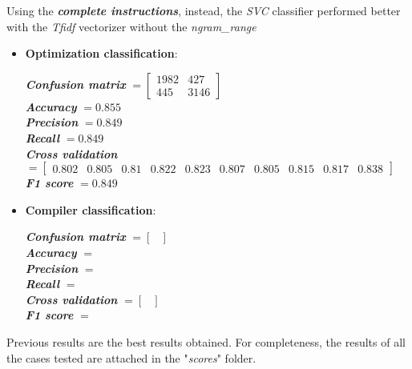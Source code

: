 \documentclass[11pt]{article}
\begin{document}
Using the \textbf{\textit{complete instructions}}, instead, the \textit{SVC} classifier performed better with the \textit{Tfidf} vectorizer without the \textit{ngram\_range}
\begin{itemize}
	\item \textbf{Optimization classification}: \\
	\begin{center}
		\textbf{\textit{Confusion matrix}} $= \begin{bmatrix}
		1982 & 427 \\
		445 & 3146
		\end{bmatrix}$\\
		\textbf{\textit{Accuracy}} $= 0.855$\\
		\textbf{\textit{Precision}} $= 0.849$\\
		\textbf{\textit{Recall}} $= 0.849$\\
		\textbf{\textit{Cross validation}} $= \begin{bmatrix}
		0.802 & 0.805 & 0.81 & 0.822 & 0.823 & 0.807 & 0.805 & 0.815 & 0.817 & 0.838
		\end{bmatrix}$\\
		\textbf{\textit{F1 score}} $= 0.849$
	\end{center}
	
	\item \textbf{Compiler classification}: \\
	\begin{center}
		\textbf{\textit{Confusion matrix}} $= \begin{bmatrix}
		
		\end{bmatrix}$\\
		\textbf{\textit{Accuracy}} $= $\\
		\textbf{\textit{Precision}} $= $\\
		\textbf{\textit{Recall}} $= $\\
		\textbf{\textit{Cross validation}} $= \begin{bmatrix}
		
		\end{bmatrix}$\\
		\textbf{\textit{F1 score}} $= $
	\end{center}
\end{itemize}
Previous results are the best results obtained. For completeness, the results of all the cases tested are attached in the "\textit{scores}" folder.
\end{document}
